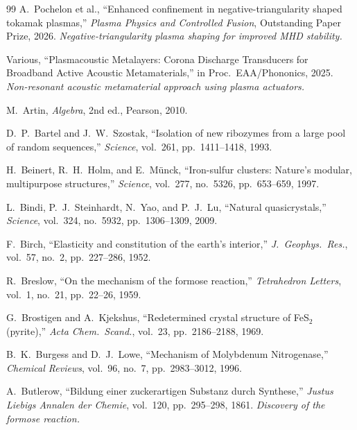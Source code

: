 \begin{thebibliography}{99}
A.~Pochelon et al.,
``Enhanced confinement in negative-triangularity shaped tokamak plasmas,''
\emph{Plasma Physics and Controlled Fusion}, Outstanding Paper Prize, 2026.
\textit{Negative-triangularity plasma shaping for improved MHD stability.}

Various,
``Plasmacoustic Metalayers: Corona Discharge Transducers for Broadband Active Acoustic Metamaterials,''
in Proc.\ EAA/Phononics, 2025.
\textit{Non-resonant acoustic metamaterial approach using plasma actuators.}


M.~Artin,
\emph{Algebra},
2nd ed., Pearson, 2010.

D.~P.~Bartel and J.~W.~Szostak,
``Isolation of new ribozymes from a large pool of random sequences,''
\emph{Science}, vol.~261, pp.~1411--1418, 1993.

H.~Beinert, R.~H.~Holm, and E.~M\"unck,
``Iron-sulfur clusters: Nature's modular, multipurpose structures,''
\emph{Science}, vol.~277, no.~5326, pp.~653--659, 1997.

L.~Bindi, P.~J.~Steinhardt, N.~Yao, and P.~J.~Lu,
``Natural quasicrystals,''
\emph{Science}, vol.~324, no.~5932, pp.~1306--1309, 2009.

F.~Birch,
``Elasticity and constitution of the earth's interior,''
\emph{J.\ Geophys.\ Res.}, vol.~57, no.~2, pp.~227--286, 1952.

R.~Breslow,
``On the mechanism of the formose reaction,''
\emph{Tetrahedron Letters}, vol.~1, no.~21, pp.~22--26, 1959.

G.~Brostigen and A.~Kjekshus,
``Redetermined crystal structure of FeS$_2$ (pyrite),''
\emph{Acta Chem.\ Scand.}, vol.~23, pp.~2186--2188, 1969.

B.~K.~Burgess and D.~J.~Lowe,
``Mechanism of Molybdenum Nitrogenase,''
\emph{Chemical Reviews}, vol.~96, no.~7, pp.~2983--3012, 1996.

A.~Butlerow,
``Bildung einer zuckerartigen Substanz durch Synthese,''
\emph{Justus Liebigs Annalen der Chemie}, vol.~120, pp.~295--298, 1861.
\textit{Discovery of the formose reaction.}


\end{thebibliography}
